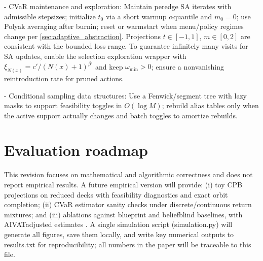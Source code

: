 \documentclass[10pt]{article}
\newcommand{\1}{\mathbf{1}}
\theoremstyle{plain}
\begin{document}
- CVaR maintenance and exploration: Maintain per\textendash edge SA iterates with admissible stepsizes; initialize $t_0$ via a short warm\textendash up $\alpha$\textendash quantile and $m_0=0$; use Polyak averaging after burn\textendash in; reset or warm\textendash start when menu/policy regimes change per \cref{sec:adaptive_abstraction}. Projections $t\in[-1,1]$, $m\in[0,2]$ are consistent with the bounded loss range. To guarantee infinitely many visits for SA updates, enable the selection exploration wrapper with $\xi_{N(x)}=c'/(N(x)+1)^{\beta'}$ and keep $\omega_{\min}>0$; ensure a nonvanishing reintroduction rate for pruned actions.

- Conditional sampling data structures: Use a Fenwick/segment tree with lazy masks to support feasibility toggles in $O(\log M)$; rebuild alias tables only when the active support actually changes and batch toggles to amortize rebuilds.

\section{Evaluation roadmap}
This revision focuses on mathematical and algorithmic correctness and does not report empirical results. A future empirical version will provide: (i) toy CPB projections on reduced decks with feasibility diagnostics and exact orbit completion; (ii) CVaR estimator sanity checks under discrete/continuous return mixtures; and (iii) ablations against blueprint and belief\textendash blind baselines, with AIVAT\textendash adjusted estimates \citep{burch2018aivat}. A single simulation script (simulation.py) will generate all figures, save them locally, and write key numerical outputs to results.txt for reproducibility; all numbers in the paper will be traceable to this file.
\end{document}
